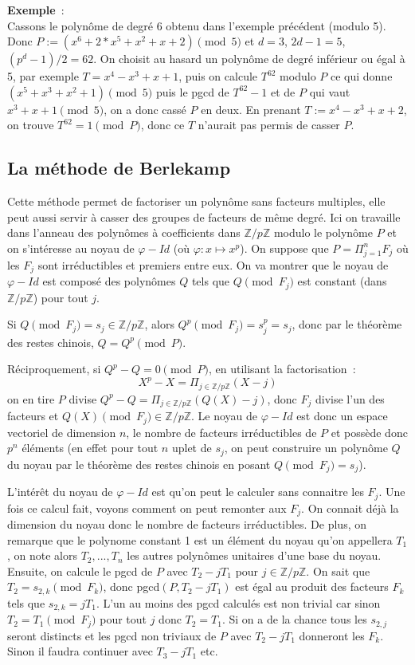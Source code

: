 \documentclass[a4paper,11pt]{book}
\begin{document}
\begin{giacjshere}
{\bf Exemple}~:\\ 
Cassons le polynôme de degré 6 obtenu dans l'exemple précédent
(modulo 5). Donc $P:=(x^6+2*x^5+x^2+x+2) \pmod 5$ et $d=3$, $2d-1=5$,
$(p^{d}-1)/2=62$.
On choisit au hasard un polynôme de degré inférieur ou égal à 5, par exemple
$T=x^4-x^3+x+1$, puis on calcule $T^{62}$ modulo $P$ ce qui donne
$(x^5+x^3+x^2+1) \pmod 5$ puis le pgcd de $T^{62}-1$ et de $P$
qui vaut $x^3+x+1 \pmod 5$, on a donc cassé $P$ en deux. 
En prenant $T:=x^4-x^3+x+2$, on trouve $T^{62}=1 \pmod P$, donc
ce $T$ n'aurait pas permis de casser $P$.

\subsection{La méthode de Berlekamp}
Cette méthode permet de factoriser un polynôme sans facteurs multiples,
elle peut aussi servir à casser des groupes de facteurs de même degré.
Ici on travaille dans l'anneau des polynômes à coefficients dans $\mathbb{Z}/p\mathbb{Z}$
modulo le polynôme $P$ et on s'intéresse au noyau de $\varphi-Id$
(où $\varphi: x \mapsto x^p$). On
suppose que $P=\Pi_{j=1}^n F_j$ où les $F_j$ sont irréductibles et
premiers entre eux. On va montrer que le noyau de $\varphi-Id$ est
composé des polynômes $Q$ tels que $Q \pmod {F_j}$ est constant
(dans $\mathbb{Z}/p\mathbb{Z}$) pour tout $j$.

Si $Q \pmod {F_j}=s_j \in \mathbb{Z}/p\mathbb{Z}$, alors $Q^p \pmod {F_j}=s_j^p=s_j$, donc
par le théorème des restes chinois, $Q=Q^p \pmod P$. 

Réciproquement, si
$Q^p-Q=0 \pmod P$, en utilisant la factorisation~:
\[ X^p-X= \Pi_{j \in \mathbb{Z}/p\mathbb{Z} } (X-j)\]
on en tire $P$ divise $Q^p-Q=\Pi_{j \in \mathbb{Z}/p\mathbb{Z} } (Q(X)-j)$,
donc $F_j$ divise l'un des facteurs et $Q(X) \pmod {F_j} \in \mathbb{Z}/p\mathbb{Z}$.
Le noyau de $\varphi -Id$
est donc un espace vectoriel de dimension $n$, le nombre
de facteurs irréductibles de $P$ et possède donc $p^n$ éléments
(en effet pour tout $n$ uplet de $s_j$, on peut construire un polynôme
$Q$ du noyau par le théorème des restes chinois en posant $Q\pmod {F_j}=s_j$).

L'intérêt du noyau de $\varphi-Id$ est qu'on peut le calculer sans connaitre
les $F_j$. Une fois ce calcul fait, voyons comment on peut remonter 
aux $F_j$. On connait déjà la dimension du noyau donc le nombre de facteurs
irréductibles. De plus, on remarque que le polynome constant 1 est un
élément du noyau qu'on appellera $T_1$, on note alors $T_2,...,T_n$ les
autres polynômes unitaires d'une base du noyau. 
Ensuite, on calcule le pgcd de $P$ avec $T_2-jT_1$
pour $j\in \mathbb{Z}/p\mathbb{Z}$. On sait que $T_2=s_{2,k} \pmod {F_k}$, donc pgcd$(P,T_2-jT_1)$
est égal au produit des facteurs $F_k$ tels que $s_{2,k}=jT_1$. L'un au moins
des pgcd calculés est non trivial car sinon $T_2=T_1 \pmod{F_j}$ pour
tout $j$ donc $T_2=T_1$. Si on a de la chance tous les $s_{2,j}$ seront
distincts et les pgcd non triviaux de $P$ avec $T_2-jT_1$ donneront les $F_k$.
Sinon il faudra continuer avec $T_3-jT_1$ etc.


\end{giacjshere}
\end{document}
